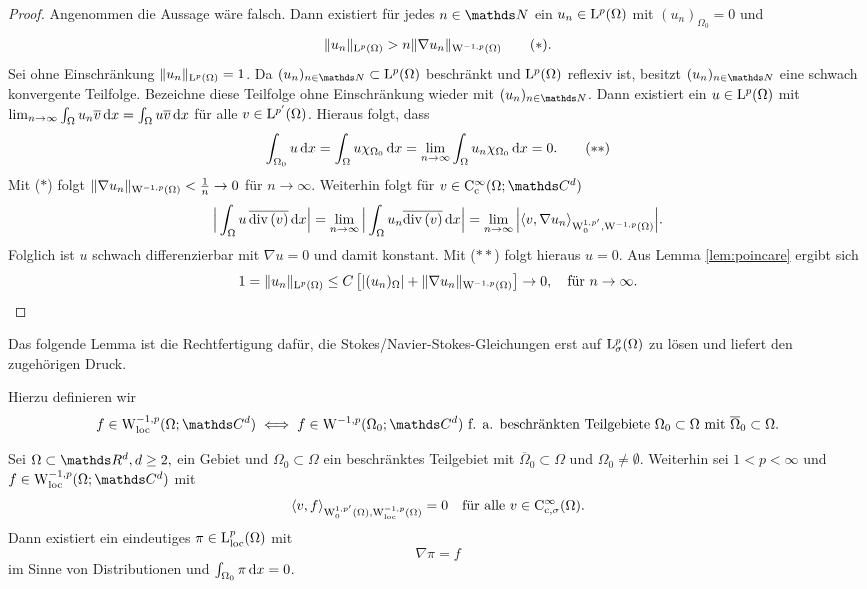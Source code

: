 \begin{proof}
  Angenommen die Aussage wäre falsch.
  Dann existiert für jedes $n \in \N$ ein $u_n \in \mathrm{L}^p(\Omega)$ mit $(u_n)_{\Omega_0} = 0$ und
  \begin{align*}
    \|u_n\|_{\mathrm{L}^p(\Omega)} > n \|\nabla u_n \|_{\mathrm{W}^{-1,p}(\Omega)} \tag{$\ast$}.
  \end{align*}
  Sei ohne Einschränkung $\|u_n\|_{\mathrm{L}^p(\Omega)} = 1$.
  Da $(u_n)_{n \in \N} \subset \Ell^p(\Omega)$ beschränkt und $\mathrm{L}^p(\Omega)$ reflexiv ist, besitzt $(u_n)_{n \in \N}$ eine schwach konvergente Teilfolge.
  Bezeichne diese Teilfolge ohne Einschränkung wieder mit $(u_n)_{n \in \N}$.
  Dann existiert ein $u \in \mathrm{L}^p(\Omega)$ mit $\lim_{n \to \infty} \int_\Omega u_n \overline v \, {\operatorname{d}\!{x}} = \int_\Omega u \overline v \, {\operatorname{d}\!{x}}$ für alle $v \in \mathrm{L}^{p'}(\Omega)$.
  Hieraus folgt, dass
  \begin{align*}
  \int_{\Omega_0} u \, {\operatorname{d}\!{x}} 
  = \int_\Omega u \chi_{\Omega_0} \, {\operatorname{d}\!{x}}
  = \lim_{n \to \infty} \int_\Omega u_n \chi_{\Omega_0} \, {\operatorname{d}\!{x}} = 0. \tag{$\ast\ast$}
  \end{align*}
  Mit ($\ast$) folgt $\|\nabla u_n\|_{\mathrm{W}^{-1,p}(\Omega)} < \frac{1}{n} \to 0$ für $n \to \infty$.
  Weiterhin folgt für $v \in \CC_\cc^\infty(\Omega;\C^d)$
  $$
  \Big| \int_\Omega u \, \overline{\mathrm{div\,} (v)} \, {\operatorname{d}\!{x}} \Big|
  = \lim_{n \to \infty} \Big| \int_\Omega u_n \overline{\mathrm{div\,} (v)} \, {\operatorname{d}\!{x}} \Big|
  = \lim_{n \to \infty} \Big| \langle v, \nabla u_n \rangle_{\mathrm{W}_0^{1,p'}, \mathrm{W}^{-1,p}(\Omega)} \Big|.
  $$
  Folglich ist $u$ schwach differenzierbar mit $\nabla u = 0$ und damit konstant.
  Mit ($\ast\ast$) folgt hieraus $u = 0$.
  Aus Lemma \ref{lem:poincare} ergibt sich
  \[
  1 = \|u_n\|_{\mathrm{L}^p(\Omega)}
  \leq C \left[ |(u_n)_\Omega| + \|\nabla u_n\|_{\mathrm{W}^{-1,p}(\Omega)} \right] \to 0, \quad\text{für } n \to \infty. \qedhere
  \]
\end{proof}

Das folgende Lemma ist die Rechtfertigung dafür, die Stokes/Navier-Stokes-Gleichungen erst auf $\mathrm{L}_\sigma^p(\Omega)$ zu lösen und liefert den zugehörigen Druck.

Hierzu definieren wir
$$
f \in \WW_{\loc}^{-1,p}(\Omega; \C^d) \iff f \in \WW^{-1,p}(\Omega_0; \C^d) \text{ f. a. beschränkten Teilgebiete } \Omega_0 \subset \Omega \text{ mit } \overline\Omega_0 \subset \Omega.
$$

\begin{lem}
  \label{lem:pressureGrad}
  Sei $\Omega \subset \R^d, d \geq 2,$ ein Gebiet und $\Omega_0 \subset \Omega$ ein beschränktes Teilgebiet mit $\overline\Omega_0 \subset \Omega$ und $\Omega_0 \neq \emptyset$.
  Weiterhin sei $1 < p < \infty$ und $f \in \WW_{\loc}^{-1,p}(\Omega; \C^d)$ mit
  $$
  \langle v , f \rangle_{\mathrm{W}_0^{1,p'}(\Omega), \mathrm{W}_{\operatorname{loc}}^{-1,p}(\Omega)} = 0 \quad\text{für alle } v \in \mathrm{C}_{\mathrm{c},\sigma}^\infty(\Omega).
  $$
  Dann existiert ein eindeutiges $\pi \in \mathrm{L}^p_{\operatorname{loc}}(\Omega)$ mit
  $$
  \nabla \pi = f
  $$
  im Sinne von Distributionen und $\int_{\Omega_0} \pi \, {\operatorname{d}\!{x}} = 0$.
\end{lem}

